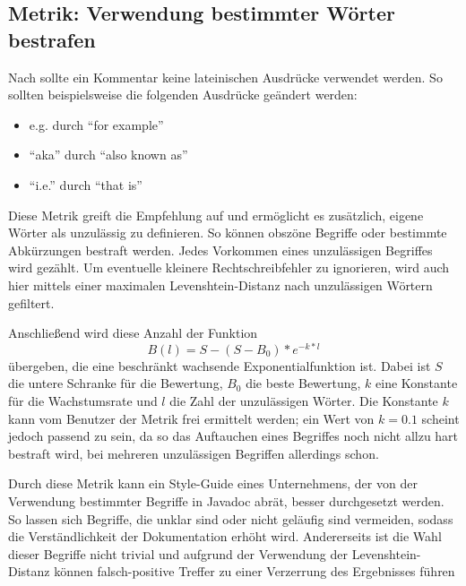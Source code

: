 \subsection{Metrik: Verwendung bestimmter Wörter bestrafen}\label{chapter:metric_certain_words}
Nach \cite{HowtoWriteDocCommentsfortheJavadocTool} sollte ein Kommentar keine lateinischen Ausdrücke verwendet werden. So sollten beispielsweise die folgenden Ausdrücke geändert werden:
\begin{itemize}
    \item {e.g.} durch \enquote{for example}
    \item \enquote{aka} durch \enquote{also known as}
    \item \enquote{i.e.} durch \enquote{that is} 
    
\end{itemize}
Diese Metrik greift die Empfehlung auf und ermöglicht es zusätzlich, eigene Wörter als unzulässig zu definieren. So können obszöne Begriffe oder bestimmte Abkürzungen bestraft werden. Jedes Vorkommen eines unzulässigen Begriffes wird gezählt. Um eventuelle kleinere Rechtschreibfehler zu ignorieren, wird auch hier mittels einer maximalen Levenshtein-Distanz nach unzulässigen Wörtern gefiltert.

Anschließend wird diese Anzahl der Funktion
\begin{equation}
     B(l)=S-(S-B_0)*e^{-k*l}
 \end{equation} übergeben, die eine beschränkt wachsende Exponentialfunktion ist. Dabei ist $S$ die untere Schranke für die Bewertung, $B_0$ die beste Bewertung,  $k$ eine Konstante für die Wachstumsrate und $l$ die Zahl der unzulässigen Wörter. 
  Die Konstante $k$ kann vom Benutzer der Metrik frei ermittelt werden; ein Wert von $k=0.1$ scheint jedoch passend zu sein, da so das Auftauchen eines Begriffes noch nicht allzu hart bestraft wird, bei mehreren unzulässigen Begriffen allerdings schon.
  
  Durch diese Metrik kann ein Style-Guide eines Unternehmens, der von der Verwendung bestimmter Begriffe in Javadoc abrät, besser durchgesetzt werden. So lassen sich Begriffe, die unklar sind oder nicht geläufig sind vermeiden, sodass die Verständlichkeit der Dokumentation erhöht wird. Andererseits ist die Wahl dieser Begriffe nicht trivial und aufgrund der Verwendung der Levenshtein-Distanz können falsch-positive Treffer zu einer Verzerrung des Ergebnisses führen
